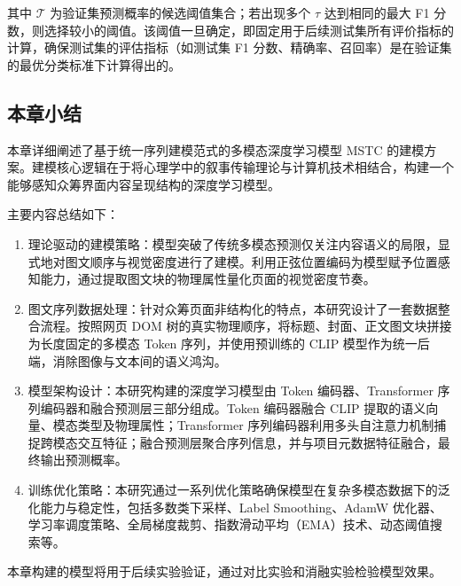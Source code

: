 其中 $ \mathcal{T} $ 为验证集预测概率的候选阈值集合；若出现多个 $ \tau $ 达到相同的最大 F1 分数，则选择较小的阈值。该阈值一旦确定，即固定用于后续测试集所有评价指标的计算，确保测试集的评估指标（如测试集 F1 分数、精确率、召回率）是在验证集的最优分类标准下计算得出的。

\subsection{本章小结}

本章详细阐述了基于统一序列建模范式的多模态深度学习模型 MSTC 的建模方案。建模核心逻辑在于将心理学中的叙事传输理论与计算机技术相结合，构建一个能够感知众筹界面内容呈现结构的深度学习模型。

主要内容总结如下：

\begin{enumerate}
\def\labelenumi{(\arabic{enumi})}
\item
  理论驱动的建模策略：模型突破了传统多模态预测仅关注内容语义的局限，显式地对图文顺序与视觉密度进行了建模。利用正弦位置编码为模型赋予位置感知能力，通过提取图文块的物理属性量化页面的视觉密度节奏。
\item
  图文序列数据处理：针对众筹页面非结构化的特点，本研究设计了一套数据整合流程。按照网页 DOM 树的真实物理顺序，将标题、封面、正文图文块拼接为长度固定的多模态 Token 序列，并使用预训练的 CLIP 模型作为统一后端，消除图像与文本间的语义鸿沟。
\item
  模型架构设计：本研究构建的深度学习模型由 Token 编码器、Transformer 序列编码器和融合预测层三部分组成。Token 编码器融合 CLIP 提取的语义向量、模态类型及物理属性；Transformer 序列编码器利用多头自注意力机制捕捉跨模态交互特征；融合预测层聚合序列信息，并与项目元数据特征融合，最终输出预测概率。
\item
  训练优化策略：本研究通过一系列优化策略确保模型在复杂多模态数据下的泛化能力与稳定性，包括多数类下采样、Label Smoothing、AdamW 优化器、学习率调度策略、全局梯度裁剪、指数滑动平均（EMA）技术、动态阈值搜索等。
\end{enumerate}

本章构建的模型将用于后续实验验证，通过对比实验和消融实验检验模型效果。
